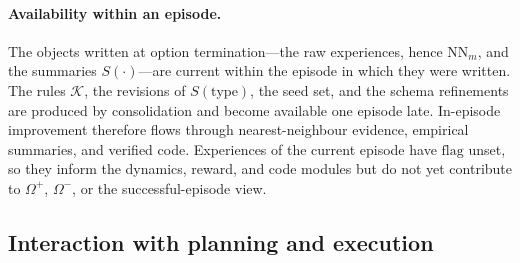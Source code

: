 \documentclass[11pt]{article}
\newcommand{\calK}{\mathcal{K}}
\newcommand{\type}{\mathrm{type}}
\begin{document}
\paragraph{Availability within an episode.}
The objects written at option termination---the raw experiences, hence $\mathrm{NN}_m$, and the summaries $S(\cdot)$---are current within the episode in which they were written. The rules $\calK$, the revisions of $S(\type)$, the seed set, and the schema refinements are produced by consolidation and become available one episode late. In-episode improvement therefore flows through nearest-neighbour evidence, empirical summaries, and verified code. Experiences of the current episode have $\mathrm{flag}$ unset, so they inform the dynamics, reward, and code modules but do not yet contribute to $\Omega^{+}$, $\Omega^{-}$, or the successful-episode view.

\subsection{Interaction with planning and execution}
\label{sec:type2-interaction}
\end{document}
